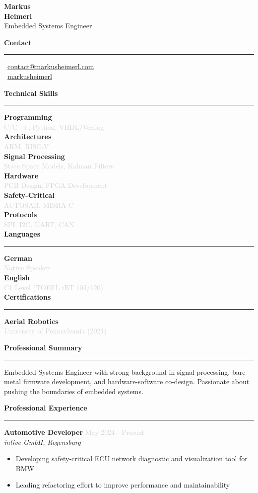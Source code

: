 \documentclass[a4paper,10pt]{article}
\newcommand{\cvsection}[1]{
    \vspace{12pt}
    {\large\bfseries\color{darkgray} #1}
    \vspace{4pt}
    \hrule
    \vspace{8pt}
}
\newcommand{\cvitem}[2]{
    \textbf{\color{darkgray}#1} \\
    \textcolor{lightgray}{\small #2} \\[5pt]
}
\newcommand{\cventry}[4]{
    \vspace{3pt}
    \textbf{\color{darkgray}#1} \hfill \textcolor{lightgray}{\small #2} \\
    \textcolor{primaryblue}{\textit{\small #3}} \\
    \vspace{3pt}
    {\small #4}
    \vspace{8pt}
}
\begin{document}
\setlength{\columnsep}{0.8cm}
\begin{paracol}{2}


\vspace{0.5cm}

\begin{center}
    {\LARGE\bfseries\color{darkgray} Markus} \\[4pt]
    {\LARGE\bfseries\color{primaryblue} Heimerl} \\[8pt]
    {\small\color{darkgray} Embedded Systems Engineer}
\end{center}

\vspace{0.6cm}

\cvsection{Contact}
\small
\faEnvelope\, \href{mailto:contact@markusheimerl.com}{contact@markusheimerl.com} \\[5pt]
\faGithub\, \href{https://github.com/markusheimerl}{markusheimerl}

\cvsection{Technical Skills}
\cvitem{Programming}{C/C++, Python, VHDL/Verilog}
\cvitem{Architectures}{ARM, RISC-V}
\cvitem{Signal Processing}{State Space Models, Kalman Filters}
\cvitem{Hardware}{PCB Design, FPGA Development}
\cvitem{Safety-Critical}{AUTOSAR, MISRA C}
\cvitem{Protocols}{SPI, I2C, UART, CAN}

\cvsection{Languages}
\cvitem{German}{Native Speaker}
\cvitem{English}{C1 Level (TOEFL iBT 105/120)}

\cvsection{Certifications}
\textbf{Aerial Robotics} \\
\textcolor{lightgray}{\small University of Pennsylvania (2021)}

\vspace{0.5cm}

\switchcolumn

\vspace{0.5cm}

\cvsection{Professional Summary}
Embedded Systems Engineer with strong background in signal processing, bare-metal firmware development, and hardware-software co-design. Passionate about pushing the boundaries of embedded systems.

\cvsection{Professional Experience}

\cventry{Automotive Developer}{May 2024 - Present}{intive GmbH, Regensburg}{
    \begin{itemize}[leftmargin=10pt, itemsep=2pt, parsep=0pt, topsep=3pt]
        \item Developing safety-critical ECU network diagnostic and visualization tool for BMW
        \item Leading refactoring effort to improve performance and maintainability
    \end{itemize}
}


\end{paracol}
\end{document}
